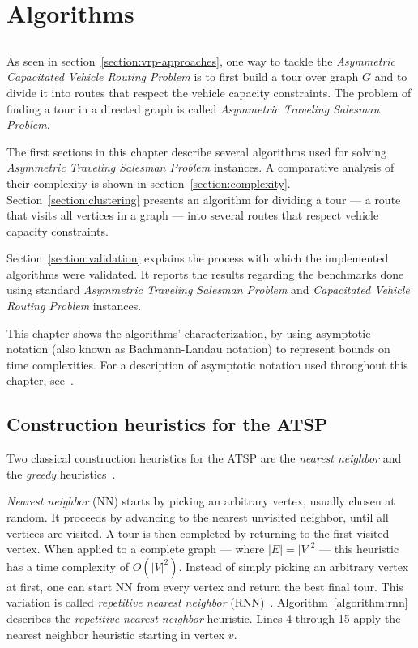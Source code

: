 \chapter{Algorithms}
\label{chap:algorithms}

\section*{}

As seen in section~\ref{section:vrp-approaches}, one way to tackle the
\textit{Asymmetric Capacitated Vehicle Routing Problem} is to first build a tour
over graph $G$ and to divide it into routes that respect the vehicle capacity
constraints. The problem of finding a tour in a directed graph is called
\textit{Asymmetric Traveling Salesman Problem}.

The first sections in this chapter describe several algorithms used for solving
\textit{Asymmetric Traveling Salesman Problem} instances. A comparative
analysis of their complexity is shown in section~\ref{section:complexity}.
Section~\ref{section:clustering} presents an algorithm for dividing a tour ---
a route that visits all vertices in a graph --- into several routes that
respect vehicle capacity constraints.

Section~\ref{section:validation} explains the process with which the implemented
algorithms were validated. It reports the results regarding the benchmarks done
using standard \textit{Asymmetric Traveling Salesman Problem} and
\textit{Capacitated Vehicle Routing Problem} instances.

This chapter shows the algorithms' characterization, by using asymptotic
notation (also known as Bachmann-Landau notation) to represent bounds on time
complexities. For a description of asymptotic notation used throughout this
chapter, see~\citet{Knuth1976}.



\section{Construction heuristics for the ATSP}
\label{section:heuristics}

Two classical construction heuristics for the ATSP are the \textit{nearest
neighbor} and the \textit{greedy} heuristics~\citep{Gutin2002}.

\textit{Nearest neighbor} (NN) starts by picking an arbitrary vertex, usually
chosen at random. It proceeds by advancing to the nearest unvisited neighbor,
until all vertices are visited. A tour is then completed by returning to the
first visited vertex.  When applied to a complete graph --- where $|E| = |V|^2$
--- this heuristic has a time complexity of $O(|V|^2)$. Instead of simply
picking an arbitrary vertex at first, one can start NN from every vertex and
return the best final tour. This variation is called \textit{repetitive nearest
neighbor} (RNN)~\citep{Gutin2002}. Algorithm~\ref{algorithm:rnn} describes the
\textit{repetitive nearest neighbor} heuristic. Lines 4 through 15 apply the
nearest neighbor heuristic starting in vertex $v$.

